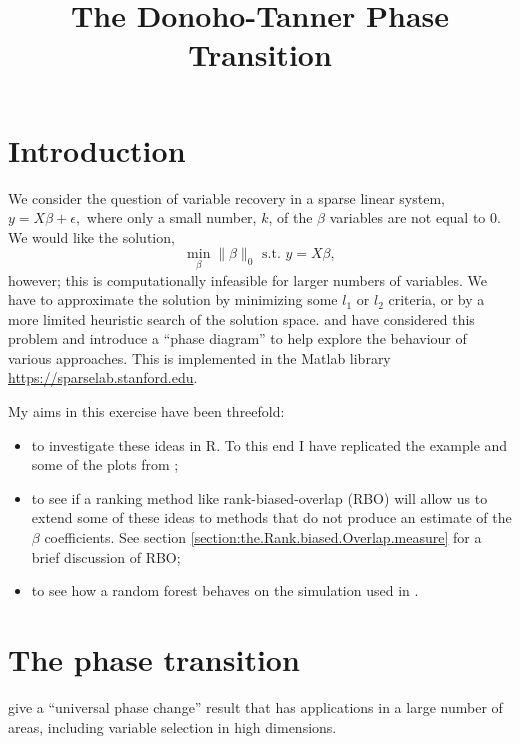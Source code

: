 \documentclass[11pt]{article}
\title{The Donoho-Tanner Phase Transition}
\author{}
\date{}
\begin{document}
\maketitle




\section{Introduction}
We consider the question of variable recovery in a sparse linear system, $y=X \beta + \epsilon,$ where only
a small number, $k$, of the $\beta$ variables are not equal to 0. We would like the solution,
\[
\min_\beta \rVert \beta \rVert_0 \textrm{ s.t. } y = X\beta,
\]
however; this is computationally infeasible for larger numbers of variables. We have to approximate the solution by
minimizing some $l_1$ or $l_2$ criteria, or by a more limited heuristic search of the solution space.
\cite{Donoho.and.Tanner.2009} and \cite{Donoho.and.Stodden.2006}  have considered this problem and introduce a ``phase
diagram'' to help explore the behaviour of various approaches.
This is implemented in the Matlab library \url{https://sparselab.stanford.edu}.

My aims in this exercise have been threefold:
\begin{itemize}
\item to investigate these ideas  in R. To this end I have replicated the example and some of the plots from
  \cite{Donoho.and.Stodden.2006};
\item to see if a ranking method like rank-biased-overlap (RBO) \cite[]{Webber2010} will allow us to extend some of these
  ideas to methods that do not produce an estimate of the $\beta$ coefficients. See section \ref{section:the.Rank.biased.Overlap.measure} for a brief
  discussion of RBO;
\item to see how a random forest behaves on the simulation used in \cite{Donoho.and.Stodden.2006}.
\end{itemize}

\section{The phase transition}
\cite{Donoho.and.Tanner.2009} give a ``universal phase change'' result that has applications in a
large number of areas, including variable selection in high dimensions.
\end{document}
